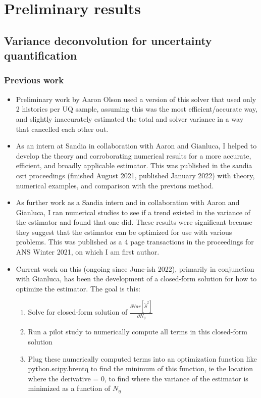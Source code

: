 
\chapter{Preliminary results} \label{ch-results}

\section{Variance deconvolution for uncertainty quantification}
\subsection{Previous work}
\begin{itemize}
    \item Preliminary work by Aaron Olson used a version of this solver that used only 2 histories per UQ sample, assuming this was the most efficient/accurate way, and slightly inaccurately estimated the total and solver variance in a way that cancelled each other out. 
    \item As an intern at Sandia in collaboration with Aaron and Gianluca, I helped to develop the theory and corroborating numerical results for a more accurate, efficient, and broadly applicable estimator. This was published in the sandia csri proceedings (finished August 2021, published January 2022) with theory, numerical examples, and comparison with the previous method. 
    \item As further work as a Sandia intern and in collaboration with Aaron and Gianluca, I ran numerical studies to see if a trend existed in the variance of the estimator and found that one did. These results were significant because they suggest that the estimator can be optimized for use with various problems. This was published as a 4 page transactions in the proceedings for ANS Winter 2021, on which I am first author.
    \item Current work on this (ongoing since June-ish 2022), primarily in conjunction with Gianluca, has been the development of a closed-form solution for how to optimize the estimator. The goal is this:
    \begin{enumerate}
        \item Solve for closed-form solution of $\frac{\partial \mathbb{V}ar[\tilde{S}^2]}{\partial N_\eta}$
        \item Run a pilot study to numerically compute all terms in this closed-form solution
        \item Plug these numerically computed terms into an optimization function like python.scipy.brentq to find the minimum of this function, ie the location where the derivative = 0, to find where the variance of the estimator is minimized as a function of $N_\eta$

\end{enumerate}
\end{itemize}
